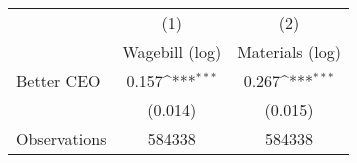 {
\def\sym#1{\ifmmode^{#1}\else\(^{#1}\)\fi}
\begin{tabular}{l*{2}{c}}
\hline\hline
                    &\multicolumn{1}{c}{(1)}&\multicolumn{1}{c}{(2)}\\
                    &\multicolumn{1}{c}{Wagebill (log)}&\multicolumn{1}{c}{Materials (log)}\\
\hline
Better CEO          &       0.157\sym{***}&       0.267\sym{***}\\
                    &     (0.014)         &     (0.015)         \\
\hline
Observations        &      584338         &      584338         \\
\hline\hline
\end{tabular}
}

